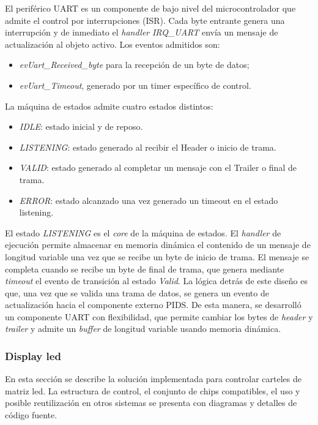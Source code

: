 El periférico UART es un componente de bajo nivel del microcontrolador que admite el control por interrupciones (ISR). Cada byte entrante genera una interrupción y de inmediato el \textit{handler} \textit{IRQ\_UART} envía un mensaje de actualización al objeto activo. Los eventos admitidos son:
\begin{itemize}
\item \textit{evUart\_Received\_byte} para la recepción de un byte de datos; 
\item \textit{evUart\_Timeout}, generado por un timer específico de control.\\
\end{itemize} 

La máquina de estados admite cuatro estados distintos:
\begin{itemize}
\item \textit{IDLE}: estado inicial y de reposo.
\item \textit{LISTENING}: estado generado al recibir el Header o inicio de trama.
\item \textit{VALID}: estado generado al completar un mensaje con el Trailer o final de trama.
\item \textit{ERROR}: estado alcanzado una vez generado un timeout en el estado listening.
\end{itemize}

El estado \textit{LISTENING} es el \textit{core} de la máquina de estados. El \textit{handler} de ejecución permite almacenar en memoria dinámica el contenido de un mensaje de longitud variable una vez que se recibe un byte de inicio de trama.  El mensaje se completa cuando se recibe un byte de final de trama, que genera mediante \textit{timeout} el evento de transición al estado \textit{Valid}. La lógica detrás de este diseño es que, una vez que se valida una trama de datos, se genera un evento de actualización hacia el componente externo PIDS. De esta manera, se desarrolló un componente UART con flexibilidad, que permite cambiar los bytes de \textit{header} y \textit{trailer} y admite un \textit{buffer} de longitud variable usando memoria dinámica. \\

\subsubsection{Display led}

En esta sección se describe la solución implementada para controlar carteles de matriz led. La estructura de control, el conjunto de chips compatibles, el uso y posible reutilización en otros sistemas se presenta con diagramas y detalles de código fuente. \\

